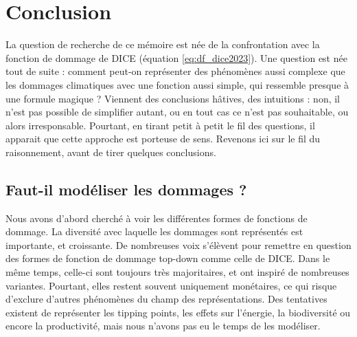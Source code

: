 \chapter{Conclusion}
\label{chapter:conclusion}
\newrefsegment




La question de recherche de ce mémoire est née de la confrontation avec la fonction de dommage de DICE (équation \ref{eq:df_dice2023}). Une question est née tout de suite : comment peut-on représenter des phénomènes aussi complexe que les dommages climatiques avec une fonction aussi simple, qui ressemble presque à une formule magique ? Viennent des conclusions hâtives, des intuitions : non, il n'est pas possible de simplifier autant, ou en tout cas ce n'est pas souhaitable, ou alors irresponsable. Pourtant, en tirant petit à petit le fil des questions, il apparait que cette approche est porteuse de sens. Revenons ici sur le fil du raisonnement, avant de tirer quelques conclusions. 



\section{Faut-il modéliser les dommages ?}

Nous avons d'abord cherché à voir les différentes formes de fonctions de dommage. La diversité avec laquelle les dommages sont représentés est importante, et croissante. De nombreuses voix s'élèvent pour remettre en question des formes de fonction de dommage top-down comme celle de DICE. Dans le même temps, celle-ci sont toujours très majoritaires, et ont inspiré de nombreuses variantes. Pourtant, elles restent souvent uniquement monétaires, ce qui risque d'exclure d'autres phénomènes du champ des représentations. Des tentatives existent de représenter les tipping points, les effets sur l'énergie, la biodiversité ou encore la productivité, mais nous n'avons pas eu le temps de les modéliser. \\

